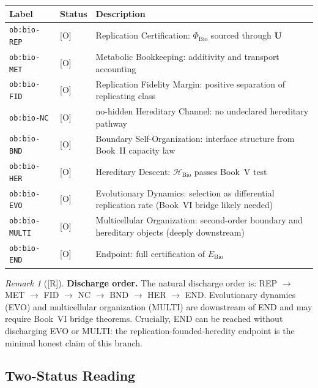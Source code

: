 \documentclass[12pt,oneside]{amsbook}
\theoremstyle{plain}
\theoremstyle{definition}
\theoremstyle{remark}
\newtheorem{remark}[theorem]{Remark}
\newcommand{\status}[1]{\textup{[#1]}}
\begin{document}
\medskip
\noindent
\begin{tabular}{|l|l|p{8.0cm}|}
\hline
\textbf{Label} & \textbf{Status} & \textbf{Description} \\
\hline
\texttt{ob:bio-REP} & [O] & Replication Certification: $\Phi_{\mathrm{Bio}}$ sourced through $\mathbf{U}$ \\
\texttt{ob:bio-MET} & [O] & Metabolic Bookkeeping: additivity and transport accounting \\
\texttt{ob:bio-FID} & [O] & Replication Fidelity Margin: positive separation of replicating class \\
\texttt{ob:bio-NC} & [O] & no-hidden Hereditary Channel: no undeclared hereditary pathway \\
\texttt{ob:bio-BND} & [O] & Boundary Self-Organization: interface structure from Book~II capacity law \\
\texttt{ob:bio-HER} & [O] & Hereditary Descent: $\mathcal{H}_{\mathrm{Bio}}$ passes Book~V test \\
\texttt{ob:bio-EVO} & [O] & Evolutionary Dynamics: selection as differential replication rate (Book~VI bridge likely needed) \\
\texttt{ob:bio-MULTI} & [O] & Multicellular Organization: second-order boundary and hereditary objects (deeply downstream) \\
\texttt{ob:bio-END} & [O] & Endpoint: full certification of $E_{\mathrm{Bio}}$ \\
\hline
\end{tabular}

\medskip

\begin{remark}[\status{R}]\label{rem:bio-discharge-order}
\textbf{Discharge order.}
The natural discharge order is: REP $\to$ MET $\to$ FID $\to$ NC
$\to$ BND $\to$ HER $\to$ END. Evolutionary dynamics (EVO) and
multicellular organization (MULTI) are downstream of END and may
require Book~VI bridge theorems. Crucially, END can be reached
without discharging EVO or MULTI: the
replication-founded-heredity endpoint is the minimal honest claim
of this branch.
\end{remark}

\subsection{Two-Status Reading}
\end{document}
